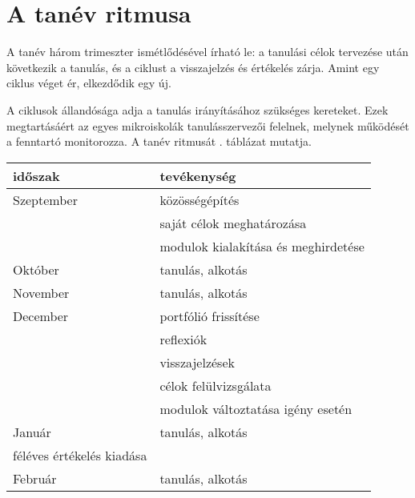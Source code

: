\section{A tanév ritmusa}
\label{sec:tanev_ritmusa}
A tanév három trimeszter ismétlődésével írható le: a tanulási célok tervezése után következik a tanulás, és a ciklust a visszajelzés és értékelés zárja.	Amint egy ciklus véget ér, elkezdődik egy új.

A ciklusok állandósága adja a tanulás irányításához szükséges kereteket. Ezek megtartásáért az egyes mikroiskolák tanulásszervezői felelnek, melynek működését a fenntartó monitorozza. A tanév ritmusát . táblázat mutatja.

\begin{table}
  \centering
  \begin{tabular}{ l|l }
    \textbf{időszak} & \textbf{tevékenység}                \\
    \hline
    Szeptember       &
    közösségépítés                                         \\
                     & saját célok meghatározása           \\
                     & modulok kialakítása és meghirdetése
    \\ \hline

    Október          &
    tanulás, alkotás
    \\ \hline

    November         &
    tanulás, alkotás
    \\ \hline

    December         &
    portfólió frissítése                                   \\
                     & reflexiók                           \\
                     & visszajelzések                      \\
                     & célok felülvizsgálata               \\
                     & modulok változtatása igény esetén
    \\ \hline

    Január           &
    tanulás, alkotás                                       \\
    féléves értékelés kiadása
    \\ \hline

    Február          &
    tanulás, alkotás
    \\ \hline


\end{tabular}
\end{table}
